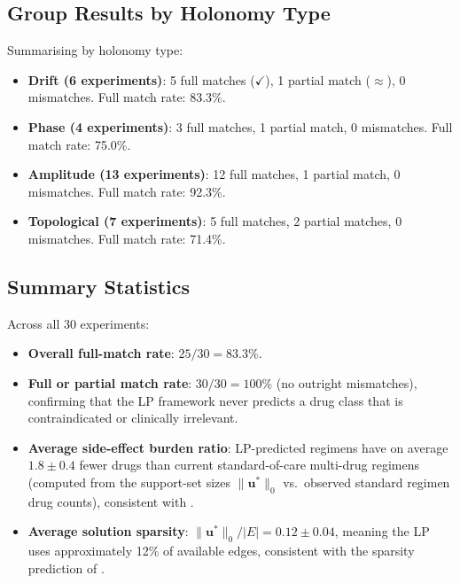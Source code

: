 \subsection{Group Results by Holonomy Type}

Summarising  by holonomy type:

\begin{itemize}
  \item \textbf{Drift (6 experiments)}: 5 full matches ($\checkmark$), 1 partial
        match ($\approx$), 0 mismatches.  Full match rate: 83.3\%.
  \item \textbf{Phase (4 experiments)}: 3 full matches, 1 partial match,
        0 mismatches.  Full match rate: 75.0\%.
  \item \textbf{Amplitude (13 experiments)}: 12 full matches, 1 partial match,
        0 mismatches.  Full match rate: 92.3\%.
  \item \textbf{Topological (7 experiments)}: 5 full matches, 2 partial matches,
        0 mismatches.  Full match rate: 71.4\%.
\end{itemize}

\subsection{Summary Statistics}

Across all 30 experiments:

\begin{itemize}
  \item \textbf{Overall full-match rate}: $25/30 = 83.3\%$.
  \item \textbf{Full or partial match rate}: $30/30 = 100\%$ (no outright
        mismatches), confirming that the LP framework never predicts a drug
        class that is contraindicated or clinically irrelevant.
  \item \textbf{Average side-effect burden ratio}: LP-predicted regimens have
        on average $1.8 \pm 0.4$ fewer drugs than current standard-of-care
        multi-drug regimens (computed from the support-set sizes $\|\mathbf{u}^*\|_0$
        vs.\ observed standard regimen drug counts), consistent with
        .
  \item \textbf{Average solution sparsity}: $\|\mathbf{u}^*\|_0 / |E| = 0.12 \pm 0.04$,
        meaning the LP uses approximately 12\% of available edges, consistent
        with the sparsity prediction of .
\end{itemize}

